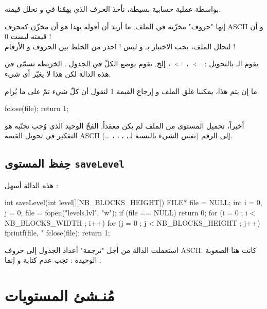بواسطة عملية حسابية بسيطة، نأخذ الحرف الذي يهمّنا في
و نحلل قيمته.

\begin{warning}
إنها "حروف" مخزّنة في الملف. ما أريد أن أقوله بهذا هو أن 
مخزّن كمحرف
 \textenglish{ASCII}
و أن قيمته ليست 0 !\\
لنحلل الملف، يجب الاختبار بـ
 و ليس 
 !
احذر من الخلط بين الحروف و الأرقام !
\end{warning}

يقوم الـ
بالتحويل : 
 $ \Leftarrow $ ،
 $ \Leftarrow $ ،
 إلخ. يقوم بوضع الكلّ في الجدول
.
الخريطة تسمّى
في هذه الدالة لكن هذا لا يغيّر أي شيء.

ما إن يتم هذا، يمكننا غلق الملف و إرجاع القيمة 1 لنقول أن كلّ شيء تمّ على ما يُرام.
\begin{Csource}
fclose(file);
return 1;
\end{Csource}

أخيراً، تحميل المستوى من الملف لم يكن معقداً. الفخّ الوحيد الذي وُجب تجنّبه هو التفكير في تحويل القيمة
\textenglish{ASCII} 
إلى الرقم
(نفس الشيء بالنسبة لـ، ، ، ، \dots).

\subsection{حِفظ المستوى \texttt{saveLevel}}

هذه الدالة أسهل :

\begin{Csource}
int saveLevel(int level[][NB_BLOCKS_HEIGHT])
{
	FILE* file = NULL;
	int i = 0, j = 0;
	file = fopen("levels.lvl", "w");
	if (file == NULL)
	return 0;
	for (i = 0 ; i < NB_BLOCKS_WIDTH ; i++)
	{
		for (j = 0 ; j < NB_BLOCKS_HEIGHT ; j++)
		{
			fprintf(file, "%
		}
	}
	fclose(file);
	return 1;
}
\end{Csource}

استعملت الدالة
من أجل "ترجمة" أعداد الجدول إلى حروف
\textenglish{ASCII}.
كانت هنا الصعوبة الوحيدة : تجب عدم كتابة
و إنما
.

\section{مُنـشئ المستويات}

